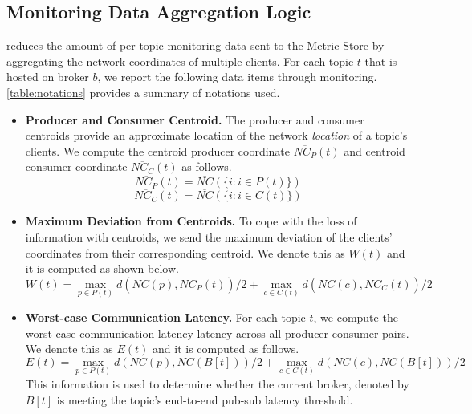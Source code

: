 \subsection{Monitoring Data Aggregation Logic}
\label{sec:epulsar_mon_aggr}
\epulsar{} reduces the amount of per-topic monitoring data sent to the Metric Store by aggregating the network coordinates of multiple clients. For each topic $t$ that is hosted on broker $b$, we report the following data items through monitoring. \cref{table:notations} provides a summary of notations used.
\begin{itemize}
\item \textbf{Producer and Consumer Centroid.} The producer and consumer centroids provide an approximate location of the network \textit{location} of a topic's clients. We compute the centroid producer coordinate $\overline{NC_P}\left( t \right)$ and centroid consumer coordinate $\overline{NC_C}\left( t \right)$ as follows.
\begin{equation*}
\overline{NC_P}\left( t \right) = \overline{NC} \left( \{ i : i \in P\left( t \right) \} \right)
\end{equation*}
\begin{equation*}
\overline{NC_C}\left( t \right) = \overline{NC} \left( \{ i : i \in C\left( t \right) \} \right)
\end{equation*}
\item \textbf{Maximum Deviation from Centroids.} To cope with the loss of information with centroids, we send the maximum deviation of the clients' coordinates from their corresponding centroid. We denote this as $W \left( t \right)$ and it is computed as shown below.
\begin{equation*}
W \left( t \right) = \max\limits_{p \in P\left( t \right)} d \left( NC \left( p\right), \overline{NC_P}\left( t \right)\right)/2 + \max\limits_{c \in C\left( t \right)} d \left( NC \left( c\right), \overline{NC_C}\left( t \right)\right)/2
\end{equation*}
\item \textbf{Worst-case Communication Latency.} For each topic $t$, we compute the worst-case communication latency latency across all producer-consumer pairs. We denote this as $E \left( t \right)$ and it is computed as follows. 
\begin{equation*}
E \left( t \right) = \max\limits_{p \in P\left( t \right)} d \left( NC \left( p\right), NC\left( B\left[ t \right] \right) \right) / 2 + \max\limits_{c \in C\left( t \right)} d \left( NC \left( c\right), NC\left( B\left[ t \right] \right) \right) / 2
\end{equation*}
This information is used to determine whether the current broker, denoted by $B\left[ t \right]$ is meeting the topic's end-to-end pub-sub latency threshold.
\end{itemize}

